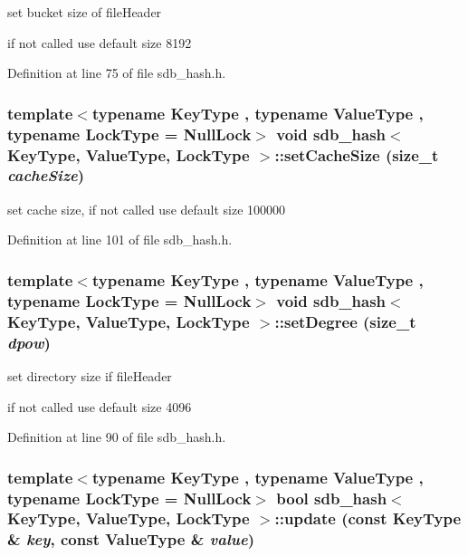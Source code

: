set bucket size of fileHeader 

if not called use default size 8192 

Definition at line 75 of file sdb\_\-hash.h.\hypertarget{classsdb__hash_f6a720d37fabe2b8a8e8bfcd161c2663}{
\subsubsection[{setCacheSize}]{\setlength{\rightskip}{0pt plus 5cm}template$<$typename KeyType , typename ValueType , typename LockType  = NullLock$>$ void {\bf sdb\_\-hash}$<$ KeyType, ValueType, LockType $>$::setCacheSize (size\_\-t {\em cacheSize})}}
\label{classsdb__hash_f6a720d37fabe2b8a8e8bfcd161c2663}


set cache size, if not called use default size 100000 

Definition at line 101 of file sdb\_\-hash.h.\hypertarget{classsdb__hash_50342daffbd37c85755e4f00f11fdf95}{
\subsubsection[{setDegree}]{\setlength{\rightskip}{0pt plus 5cm}template$<$typename KeyType , typename ValueType , typename LockType  = NullLock$>$ void {\bf sdb\_\-hash}$<$ KeyType, ValueType, LockType $>$::setDegree (size\_\-t {\em dpow})}}
\label{classsdb__hash_50342daffbd37c85755e4f00f11fdf95}


set directory size if fileHeader

if not called use default size 4096 

Definition at line 90 of file sdb\_\-hash.h.\hypertarget{classsdb__hash_d89de45c4ed1d5937fd22745e2a61f20}{
\subsubsection[{update}]{\setlength{\rightskip}{0pt plus 5cm}template$<$typename KeyType , typename ValueType , typename LockType  = NullLock$>$ bool {\bf sdb\_\-hash}$<$ KeyType, ValueType, LockType $>$::update (const KeyType \& {\em key}, \/  const ValueType \& {\em value})}}
\label{classsdb__hash_d89de45c4ed1d5937fd22745e2a61f20}


